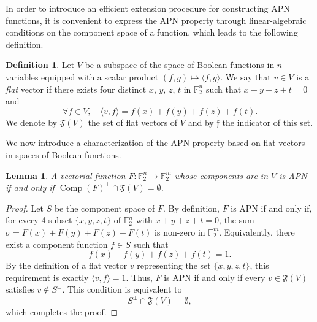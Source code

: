 \documentclass{amsart}[11pt]
\theoremstyle{plain}
\newtheorem{lemma}[theorem]{Lemma}
\theoremstyle{definition}
\newtheorem{definition}[theorem]{Definition}
\numberwithin{theorem}{section}
\numberwithin{equation}{section}
\numberwithin{table}{section}
\numberwithin{figure}{section}
\numberwithin{algorithm}{section}
\DeclareMathOperator{\comp}{Comp}
\def\flat{{\mathfrak f}}
\def\Flat(#1){{{\mathfrak F}(#1)}}
\begin{document}
In order to introduce an efficient extension procedure for constructing APN functions, it is convenient to express the APN property through linear-algebraic conditions on the component space of a function, which leads to the following definition.

\begin{definition}
	Let $V$ be a subspace of the space of Boolean functions in $n$ variables equipped with a scalar product $(f,g) \mapsto \langle f,g \rangle$. We say that $v\in V$ is a \emph{flat} vector if  there exists four distinct  $x$, $y$, $z$, $t$ in $\mathbb{F}_2^n$ such that $x+y+z+t = 0$ and 
	$$\forall  f\in V, \quad \langle v, f \rangle = f(x)+f(y)+f(z)+f(t).$$
	We denote by $\Flat(V)$ the set of flat vectors of $V$ and by $\flat$ the indicator of this set.
\end{definition}	

We now introduce a characterization of the APN property based on flat vectors in spaces of Boolean functions.
    
\begin{lemma} \label{FLAT}
	A vectorial function $F \colon \mathbb{F}_2^n \rightarrow \mathbb{F}_2^m$ whose components are in $V$ is APN if and only if $ \comp(F)^\perp \cap \Flat(V)=\emptyset$.
\end{lemma}

\begin{proof}
    Let $S$ be the component space of $F$.
    By definition, $F$ is APN if and only if, for every 4-subset $\{x, y, z, t\}$ of $\mathbb{F}_2^n$ with $x+y+z+t = 0$, the sum $\sigma = F(x)+F(y)+F(z)+F(t)$ is non-zero in $\mathbb{F}_2^m$. Equivalently, there exist a component function $f \in S$ such that $$f(x)+f(y)+f(z)+f(t) = 1.$$ By the definition of a flat vector $v$ representing the set $\{x, y, z, t\}$, this requirement is exactly $\langle v, f \rangle = 1$. Thus, $F$ is APN if and only if every $v \in \Flat(V)$ satisfies $v \notin S^\perp$. This condition is equivalent to $$ S^\perp \cap \Flat(V)  = \emptyset,$$ which completes the proof.
\end{proof}
\end{document}
